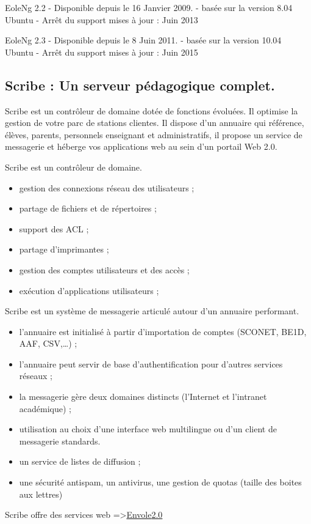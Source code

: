 \documentclass{article}
\begin{document}
EoleNg 2.2 - Disponible depuis le 16 Janvier 2009. - basée sur la
version 8.04 Ubuntu - Arrêt du support mises à jour : Juin 2013

EoleNg 2.3 - Disponible depuis le 8 Juin 2011. - basée sur la version
10.04 Ubuntu - Arrêt du support mises à jour : Juin 2015

\subsection{Scribe : Un serveur pédagogique complet.}

Scribe est un contrôleur de domaine dotée de fonctions évoluées. Il
optimise la gestion de votre parc de stations clientes. Il dispose d'un
annuaire qui référence, élèves, parents, personnels enseignant et
administratifs, il propose un service de messagerie et héberge vos
applications web au sein d'un portail Web 2.0.

Scribe est un contrôleur de domaine.

\begin{itemize}
\item
  gestion des connexions réseau des utilisateurs ;
\item
  partage de fichiers et de répertoires ;
\item
  support des ACL ;
\item
  partage d'imprimantes ;
\item
  gestion des comptes utilisateurs et des accès ;
\item
  exécution d'applications utilisateurs ;
\end{itemize}
Scribe est un système de messagerie articulé autour d'un annuaire
performant.

\begin{itemize}
\item
  l'annuaire est initialisé à partir d'importation de comptes (SCONET,
  BE1D, AAF, CSV,\ldots{}) ;
\item
  l'annuaire peut servir de base d'authentification pour d'autres
  services réseaux ;
\item
  la messagerie gère deux domaines distincts (l'Internet et l'intranet
  académique) ;
\item
  utilisation au choix d'une interface web multilingue ou d'un client de
  messagerie standards.
\item
  un service de listes de diffusion ;
\item
  une sécurité anti­spam, un anti­virus, une gestion de quotas (taille
  des boites aux lettres)
\end{itemize}
Scribe offre des services web
=\textgreater{}\href{http://eole.orion.education.fr/projects/envole/wiki/Descriptif}{}\href{http://eole.orion.education.fr/projects/envole/wiki/Descriptif}{Envole}\href{http://eole.orion.education.fr/projects/envole/wiki/Descriptif}{2.0}
\end{document}
